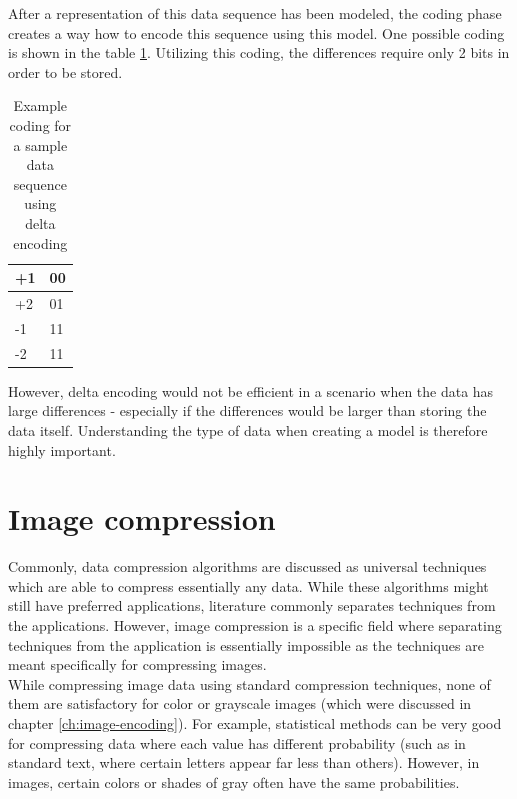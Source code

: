 \documentclass[thesis=M,english]{FITthesis}[2012/10/20]
\begin{document}
After a representation of this data sequence has been modeled, the coding phase
creates a way how to encode this sequence using this model. One possible
coding is shown in the table \ref{tab:deltacoding}. Utilizing this coding, the
differences require only 2 bits in order to be stored.
\\

\begin{table}[]
\centering
\begin{tabular}{|l|l|}
\hline
+1 & 00 \\ \hline
+2 & 01 \\ \hline
-1 & 11 \\ \hline
-2 & 11 \\ \hline
\end{tabular}
\caption{Example coding for a sample data sequence using delta encoding}
\label{tab:deltacoding}
\end{table}

However, delta encoding would not be efficient in a scenario when
the data has large differences - especially if the differences would be larger
than storing the data itself. Understanding the type of data when creating a model
is therefore highly important.


\section{Image compression}
Commonly, data compression algorithms are discussed as universal techniques
which are able to compress essentially any data. While these algorithms might still
have preferred applications, literature commonly separates techniques from the applications.
However, image compression is a specific field where separating techniques from
the application is essentially impossible as the techniques are meant specifically
for compressing images.\cite{datacompression}
\\

While compressing image data using standard compression techniques, none of them
are satisfactory for color or grayscale images (which were discussed in chapter
\ref{ch:image-encoding}). For example, statistical methods can be very good for
compressing data where each value has different probability (such as in standard
text, where certain letters appear far less than others). However, in images, certain
colors or shades of gray often have the same probabilities.\cite{datacompressioncompleteref}
\\
\end{document}
